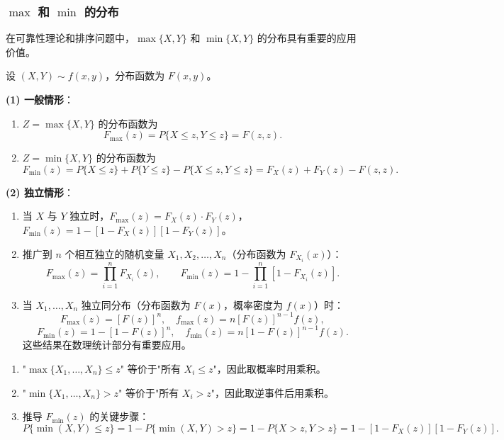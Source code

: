 \documentclass[lang=cn,11pt]{elegantbook}
\begin{document}
\subsubsection{$\max$ 和 $\min$ 的分布}

在可靠性理论和排序问题中，$\max\{X,Y\}$ 和 $\min\{X,Y\}$ 的分布具有重要的应用价值。

\begin{property}\label{prop:max-min-dist}
设 $(X,Y) \sim f(x,y)$，分布函数为 $F(x,y)$。

\textbf{(1) 一般情形}：
\begin{enumerate}
    \item $Z = \max\{X, Y\}$ 的分布函数为
    \[
    F_{\max}(z) = P\{X \leqslant z, Y \leqslant z\} = F(z, z).
    \]
    \item $Z = \min\{X, Y\}$ 的分布函数为
    \[
    F_{\min}(z) = P\{X \leqslant z\} + P\{Y \leqslant z\} - P\{X \leqslant z, Y \leqslant z\} = F_X(z) + F_Y(z) - F(z, z).
    \]
\end{enumerate}

\textbf{(2) 独立情形}：
\begin{enumerate}
    \item 当 $X$ 与 $Y$ 独立时，$F_{\max}(z) = F_X(z) \cdot F_Y(z)$，$F_{\min}(z) = 1 - [1 - F_X(z)][1 - F_Y(z)]$。
    \item 推广到 $n$ 个相互独立的随机变量 $X_1, X_2, \dots, X_n$（分布函数为 $F_{X_i}(x)$）：
    \[
    F_{\max}(z) = \prod_{i=1}^{n}F_{X_i}(z), \qquad F_{\min}(z) = 1 - \prod_{i=1}^{n}[1 - F_{X_i}(z)].
    \]
    \item 当 $X_1, \dots, X_n$ 独立同分布（分布函数为 $F(x)$，概率密度为 $f(x)$）时：
    \[
    F_{\max}(z) = [F(z)]^n, \quad f_{\max}(z) = n[F(z)]^{n-1}f(z),
    \]
    \[
    F_{\min}(z) = 1 - [1 - F(z)]^n, \quad f_{\min}(z) = n[1 - F(z)]^{n-1}f(z).
    \]
    这些结果在数理统计部分有重要应用。
\end{enumerate}
\end{property}

\begin{remark}
\begin{enumerate}
    \item "$\max\{X_1, \dots, X_n\} \leqslant z$" 等价于"所有 $X_i \leqslant z$"，因此取概率时用乘积。
    \item "$\min\{X_1, \dots, X_n\} > z$" 等价于"所有 $X_i > z$"，因此取逆事件后用乘积。
    \item 推导 $F_{\min}(z)$ 的关键步骤：
    \[
    P\{\min(X,Y) \leqslant z\} = 1 - P\{\min(X,Y) > z\} = 1 - P\{X > z, Y > z\} = 1 - [1-F_X(z)][1-F_Y(z)].
    \]
\end{enumerate}
\end{remark}
\end{document}
